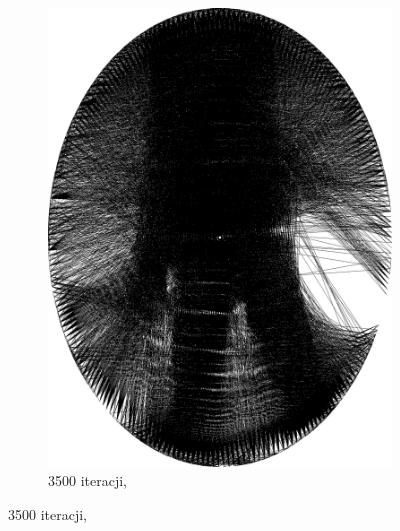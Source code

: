 \begin{figure}[H]
\begin{subfigure}{0.19\textwidth}
            \includegraphics[width = \textwidth]{img/2-theory/aldrin/030mask-aldrin_ellipse_3500_threaded.png}
            \caption{3500 iteracji, }
            \label{theory-technics-mask-aldrin-threaded-o}
        \end{subfigure}
        

\end{figure}
